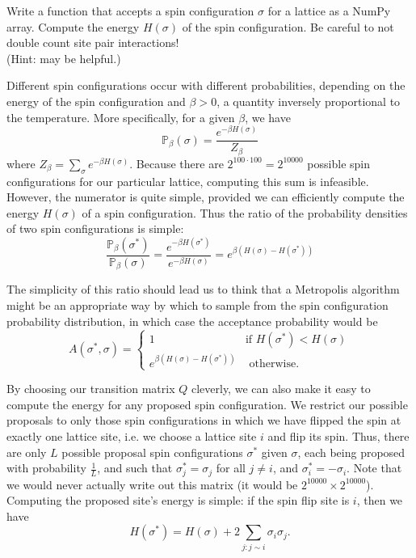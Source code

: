 \begin{problem} %
\label{problem2}
Write a function that accepts a spin configuration $\sigma$ for a lattice as a NumPy array.
Compute the energy $H(\sigma)$ of the spin configuration.
Be careful to not double count site pair interactions!
\\(Hint:  may be helpful.)
\end{problem}

Different spin configurations occur with different probabilities, depending on the energy of the spin configuration and $\beta > 0$, a quantity inversely proportional to the temperature.
More specifically, for a given $\beta$, we have
\begin{equation*}
\mathbb{P}_{\beta}(\sigma) = \frac{e^{-\beta H(\sigma)}}{Z_{\beta}}
\end{equation*}
where $Z_{\beta} = \sum_{\sigma} e^{-\beta H(\sigma)}$.
Because there are $2^{100 \cdot 100} = 2^{10000}$ possible spin configurations for our particular lattice, computing this sum is infeasible.
However, the numerator is quite simple, provided we can efficiently compute the energy $H(\sigma)$ of a spin configuration.
Thus the ratio of the probability densities of two spin configurations is simple:
\begin{equation*}
\frac{\mathbb{P}_{\beta}(\sigma^{*})}{\mathbb{P}_{\beta}(\sigma)}
= \frac{e^{-\beta H(\sigma^{*})}}{e^{-\beta H(\sigma)}}
= e^{\beta (H(\sigma) - H(\sigma^{*}))}
\end{equation*}

The simplicity of this ratio should lead us to think that a Metropolis algorithm might be an appropriate way by which to sample from the spin configuration probability distribution, in which case the acceptance probability would be
\begin{equation}
A(\sigma^{*}, \sigma) = \begin{cases} 1 & \mbox{if } H(\sigma^{*}) < H(\sigma) \\ e^{\beta (H(\sigma) - H(\sigma^{*}))} & \mbox{ otherwise.} \end{cases}
\label{eq:ising-acceptance}
\end{equation}

By choosing our transition matrix $Q$ cleverly, we can also make it easy to compute the energy for any proposed spin configuration.
We restrict our possible proposals to only those spin configurations in which we have flipped the spin at exactly one lattice site, i.e. we choose a lattice site $i$ and flip its spin.
Thus, there are only $L$ possible proposal spin configurations $\sigma^{*}$ given $\sigma$, each being proposed with probability $\frac{1}{L}$, and such that $\sigma_{j}^{*} = \sigma_{j}$ for all $j \neq i$, and $\sigma_{i}^{*} = - \sigma_{i}$.
Note that we would never actually write out this matrix (it would be $2^{10000} \times 2^{10000}$).
Computing the proposed site's energy is simple: if the spin flip site is $i$, then we have
\begin{equation}
H(\sigma^{*}) = H(\sigma) + 2\sum_{j: j \sim i} \sigma_{i}\sigma_{j}.
\label{eq:ising-new-spin-energy}
\end{equation}

